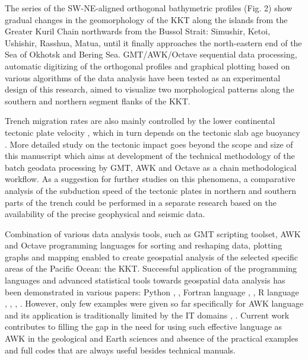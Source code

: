 \documentclass[11pt,a4paper]{report}
\begin{document}
{The series of the SW-NE-aligned orthogonal bathymetric profiles (Fig. 2) show gradual changes in the geomorphology of the \ac{KKT} along the islands from the Greater Kuril Chain northwards from the Bussol Strait: Simushir, Ketoi, Ushishir, Rasshua, Matua, until it finally approaches the north-eastern end of the Sea of Okhotsk and Bering Sea. GMT/AWK/Octave sequential data processing, automatic digitizing of the orthogonal profiles and graphical plotting based on various algorithms of the data analysis have been tested as an experimental design of this research, aimed to visualize two morphological patterns along the southern and northern segment flanks of the \ac{KKT}. 

Trench migration rates are also mainly controlled by the lower continental tectonic plate velocity \cite{Lallemandetal2008}, which in turn depends on the tectonic slab age buoyancy \cite{Chase1978}. More detailed study on the tectonic impact goes beyond the scope and size of this manuscript which aims at development of the technical methodology of the batch geodata processing by GMT, AWK and Octave as a chain methodological workflow. As a suggestion for further studies on this phenomena, a comparative analysis of the subduction speed of the tectonic plates in northern and southern parts of the trench could be performed in a separate research based on the availability of the precise geophysical and seismic data.

Combination of various data analysis tools, such as \ac{GMT} scripting toolset, AWK and Octave programming languages for sorting and reshaping data, plotting graphs and mapping enabled to create geospatial analysis of the selected specific areas of the Pacific Ocean: the \ac{KKT}. Successful application of the programming languages and advanced statistical tools towards geospatial data analysis has been demonstrated in various papers: Python \cite{Yuetal2019}, \cite{Lemenkova201989}, Fortran language \cite{Agarwal}, \cite{Chiang}, R language \cite{Robertsetal2018}, \cite{Lemenkova201868}, \cite{Lemenkova201904}, \cite{Lemenkova201991}. However, only few examples were given so far specifically for AWK language and its application is traditionally limited by the IT domains \cite{Prasad}, \cite{Vigneresse}. Current work contributes to filling the gap in the need for using such effective language as AWK \cite{Levy} in the geological and Earth sciences and  absence of the practical examples and full codes that are always useful besides technical manuals.  

}
\end{document}
